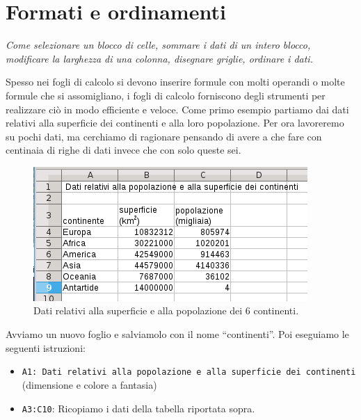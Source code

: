 \section{Formati e ordinamenti}
\label{05_01_f_di_calc:formati-e-ordinamenti}

\emph{Come selezionare un blocco di celle, sommare i dati di un intero blocco,
modificare la larghezza di una colonna, disegnare griglie,
ordinare i dati.}

Spesso nei fogli di calcolo si devono inserire formule con molti operandi o
molte formule che si assomigliano, i fogli di calcolo forniscono degli
strumenti per realizzare ciò in modo efficiente e veloce.
Come primo esempio partiamo dai dati relativi alla superficie dei continenti
e alla loro popolazione. Per ora lavoreremo su pochi dati, ma cerchiamo di
ragionare pensando di avere a che fare con centinaia di righe di dati
invece che con solo queste sei.

\begin{inaccessibleblock}
 \begin{figure}[htbp]
\centering
\begin{inaccessibleblock}
 \includegraphics[scale=0.8]{img/01_calc.png}
\end{inaccessibleblock}
\caption{Dati relativi alla superficie e alla popolazione dei 6 continenti.}
\end{figure}
\end{inaccessibleblock}

Avviamo un nuovo foglio e salviamolo con il nome ``continenti''.
Poi eseguiamo le seguenti istruzioni:

\begin{itemize} [noitemsep]
\item \texttt{A1: Dati relativi alla popolazione e alla superficie dei 
continenti}
(dimensione e colore a fantasia)
\item \texttt{A3:C10}:
Ricopiamo i dati della tabella riportata sopra.
\end{itemize}

